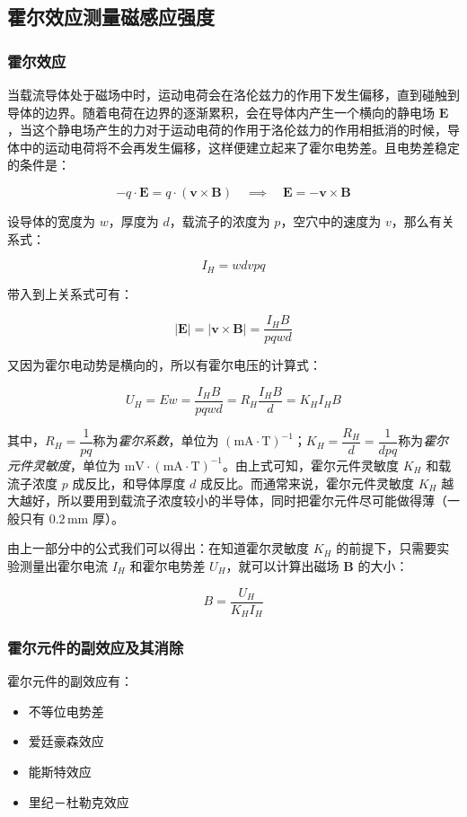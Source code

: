 \documentclass[zihao=5, UTF8]{article}
\theoremstyle{MyLineTheoremStyle} %
\theoremstyle{MyBlockTheoremStyle} %
\theoremstyle{MySubsubsectionStyle} %
\begin{document}
\subsection{霍尔效应测量磁感应强度}
\subsubsection{霍尔效应}

当载流导体处于磁场中时，运动电荷会在洛伦兹力的作用下发生偏移，直到碰触到导体的边界。随着电荷在边界的逐渐累积，会在导体内产生一个横向的静电场 $\bm E$，当这个静电场产生的力对于运动电荷的作用于洛伦兹力的作用相抵消的时候，导体中的运动电荷将不会再发生偏移，这样便建立起来了霍尔电势差。且电势差稳定的条件是：

\[
-q \cdot \bm E = q \cdot (\bm v \times \bm B) \quad \implies \quad \bm E = -\bm v \times \bm B
\]

设导体的宽度为 $w$，厚度为 $d$，载流子的浓度为 $p$，空穴中的速度为 $v$，那么有关系式：

\[
I_H = wdvpq
\]

带入到上关系式可有：

\[
|\bm E| = |\bm v \times \bm B| = \frac{I_H B}{pqwd}
\]

又因为霍尔电动势是横向的，所以有霍尔电压的计算式：

\[
U_H = Ew = \frac{I_H B}{pqwd} = R_H \frac{I_H B}{d} = K_H I_H B
\]

其中，$R_H = \dfrac{1}{pq}$称为\textit{霍尔系数}，单位为 $\mathrm{(mA \cdot T)^{-1}}$；$K_H = \dfrac{R_H}{d} = \dfrac{1}{dpq}$称为\textit{霍尔元件灵敏度}，单位为 $\mathrm{mV \cdot (mA \cdot T)^{-1}}$。由上式可知，霍尔元件灵敏度 $K_H$ 和载流子浓度 $p$ 成反比，和导体厚度 $d$ 成反比。而通常来说，霍尔元件灵敏度 $K_H$ 越大越好，所以要用到载流子浓度较小的半导体，同时把霍尔元件尽可能做得薄（一般只有 $0.2 \, \mathrm{mm}$ 厚）。

由上一部分中的公式我们可以得出：在知道霍尔灵敏度 $K_H$ 的前提下，只需要实验测量出霍尔电流 $I_H$ 和霍尔电势差 $U_H$，就可以计算出磁场 $\bm B$ 的大小：

\[
B = \frac{U_H}{K_H I_H}
\]

\subsubsection{霍尔元件的副效应及其消除}

霍尔元件的副效应有：
\begin{itemize}
    \item 不等位电势差
    \item 爱廷豪森效应
    \item 能斯特效应
    \item 里纪－杜勒克效应
\end{itemize}
\end{document}
